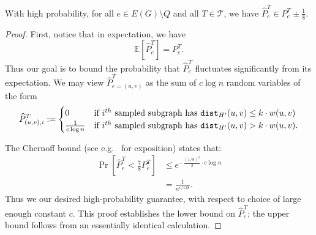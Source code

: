 \begin{lemma}  \label{lem:whpguarantee}
With high probability, for all $e \in E(G) \setminus Q$ and all $T \in \mathcal{T}$, we have
$\widehat{P}^T_e \in P^T_e \pm \frac{1}{8}.$
\end{lemma}
\begin{proof}
First, notice that in expectation, we have
$$\mathbb{E}\left[\widehat{P}^T_e\right] = P^T_e.$$
Thus our goal is to bound the probability that $\widehat{P}^T_e$ fluctuates significantly from its expectation.
We may view $\widehat{P}^T_{e=(u, v)}$ as the sum of $c \log n$ random variables of the form
$$\widehat{P}^T_{(u, v), i} := \begin{cases}
0 & \text{if } i^{th} \text{ sampled subgraph has } \texttt{dist}_{H'}(u, v) \le k \cdot w(u, v)\\
\frac{1}{c \log n} & \text{if } i^{th} \text{ sampled subgraph has } \texttt{dist}_{H'}(u, v) > k \cdot w(u, v).
\end{cases}$$

The Chernoff bound (see e.g.\ \cite{DP09} for exposition) states that:
\begin{align*}
\Pr\left[ \widehat{P}_e^T < \frac{7}{8} P_e^T \right] &\le e^{-\frac{(1/8)^2}{2} \cdot c \log n}\\
&= \frac{1}{n^{c/128}}.
\end{align*}
Thus we our desired high-probability guarantee, with respect to choice of large enough constant $c$.
This proof establishes the lower bound on $\widehat{P}^T_e$; the upper bound follows from an essentially identical calculation.
\end{proof}


